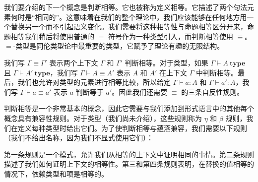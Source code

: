 \documentclass{ctexrep}
\theoremstyle{plain}
\theoremstyle{definition}
\theoremstyle{remark}
\theoremstyle{definition}
\theoremstyle{definition}
\theoremstyle{definition}
\newcommand{\Type}{\textbf{type}}
\begin{document}
我们要介绍的下一个概念是判断相等。它也被称为定义相等。它描述了两个句法元素何时是“相同的”。这意味着在我们的整个理论中，我们应该能够在任何地方用一个替换另一个而不引起语义变化。我们需要将这种相等性与命题相等区分开来，命题相等我们稍后将使用普通的 $=$ 符号作为一种类型引入，而判断相等使用 $\equiv$。$=$-类型是同伦类型论中最重要的类型，它赋予了理论有趣的无限结构。

我们写 $\Gamma \equiv \Gamma'$ 表示两个上下文 $\Gamma$ 和 $\Gamma'$ 判断相等。对于类型，如果 $\Gamma \vdash A\ \Type$ 且 $\Gamma \vdash A'\ \Type$，我们写 $\Gamma \vdash A\equiv A'$ 表示 $A$ 和 $A'$ 在上下文 $\Gamma$ 中判断相等。最后，我们也允许对类型的元素进行相等比较，所以给定 $\Gamma \vdash a:A$ 和 $\Gamma \vdash a':A$，我们写 $\Gamma \vdash a\equiv a'$ 表示 $a$ 判断等于 $a'$。因此我们还需要 $\equiv$ 的三条自反性规则。

判断相等是一个非常基本的概念，因此它需要与我们添加到形式语言中的其他每个概念具有兼容性规则。对于类型（我们尚未介绍），这些规则称为 $\eta$ 和 $\beta$ 规则，我们在定义每种类型时给出它们。为了使判断相等与蕴涵兼容，我们需要以下规则（我们不给出名称，因为我们不显式使用它们）：
第一条规则是一个模式，允许我们从相等的上下文中证明相同的事情。第二条规则描述了我们如何证明上下文的相等性。第三和第四条规则表明，在替换的值相等的情况下，依赖类型和项是相等的。
\end{document}
